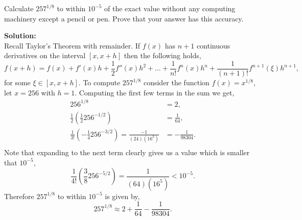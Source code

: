 \documentclass[12pt]{article}
\makeatletter
\theoremstyle{homework}
\newenvironment{exercise}[1]
{\def\@currentlabel{#1}\exercisecore}
{\endexercisecore}
\newcommand{\localhead}[1]{\par\smallskip\noindent\textbf{#1}\nobreak\\}%
\newcommand\solution{\localhead{Solution:}}
\makeatother
\begin{document}
\begin{exercise}{Problem P1} Calculate $257^{1/8}$ to within $10^{-5}$ of the exact value without any 
  computing machinery except a pencil or pen. Prove that your answer has this accuracy. 
  \solution
  Recall Taylor's Theorem with remainder. If $f(x)$ has $n + 1$ continuous derivatives on the interval $[x, x+h]$
  then the following holds, 
  \begin{equation*}
    f(x + h) = f(x) + f'(x)h + \frac{1}{2}f''(x)h^2 +...+\frac{1}{n!}f^n(x)h^n + \frac{1}{(n+1)!}f^{n + 1}(\xi)h^{n+1},
  \end{equation*}
  for some $\xi \in [x, x+h]$. To compute $257^{1/8}$ consider the function $f(x) = x^{1/8}$, let $x = 256$ with $h = 1$. Computing the first few terms in the sum we get, 
  \begin{align*}
    256^{1/8} &= 2,\\
    \frac{1}{2}\left(\frac{1}{2}256^{-1/2}\right) &= \frac{1}{64},\\
    \frac{1}{3!}\left(-\frac{1}{4}256^{-3/2}\right) = \frac{-1}{(24)(16^3)} &= -\frac{1}{98304}.\\
  \end{align*}
  Note that expanding to the next term clearly gives us a value which is smaller that $10^{-5}$, 
  \begin{equation*}
    \frac{1}{4!}\left(\frac{3}{8}256^{-5/2}\right) = \frac{1}{(64)(16^5)} < 10^{-5}. 
  \end{equation*}
  Therefore $257^{1/8}$ to within $10^{-5}$ is given by, 
  \begin{equation*}
    257^{1/8} \approx 2 + \frac{1}{64} - \frac{1}{98304}.
  \end{equation*}
\end{exercise}
\vspace{1in}
\end{document}
